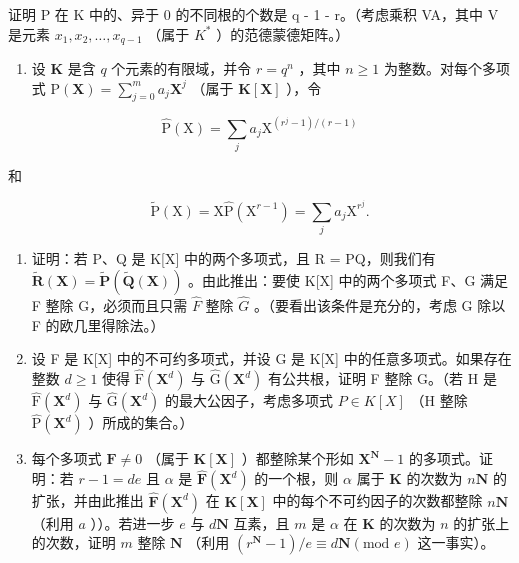 证明 P 在 K 中的、异于 0 的不同根的个数是 q - 1 - r。（考虑乘积 VA，其中 V 是元素 \(x_{1}, x_{2}, \ldots, x_{q-1}\) （属于 \(K^{*}\) ）的范德蒙德矩阵。）

\begin{enumerate}
\def\labelenumi{\arabic{enumi})}
\setcounter{enumi}{8}
\tightlist
\item
  设 \(\mathbf{K}\) 是含 \(q\) 个元素的有限域，并令 \(r = q^n\) ，其中 \(n \geqslant 1\) 为整数。对每个多项式 \(\mathrm{P}(\mathbf{X}) = \sum_{j=0}^{m} a_j \mathbf{X}^j\) （属于 \(\mathbf{K}[\mathbf{X}]\) ），令
\end{enumerate}

\[
\hat {\mathrm{P}} (\mathrm{X}) = \sum_ {j} a _ {j} \mathrm{X} ^ {(r ^ {j} - 1) / (r - 1)}
\]

和

\[
\tilde {\mathrm{P}} (\mathrm{X}) = \mathrm{X} \hat {\mathrm{P}} \left(\mathrm{X} ^ {r - 1}\right) = \sum_ {j} a _ {j} \mathrm{X} ^ {r ^ {j}}.
\]

\begin{enumerate}
\def\labelenumi{\alph{enumi})}
\item
  证明：若 P、Q 是 K{[}X{]} 中的两个多项式，且 R = PQ，则我们有 \(\tilde{\mathbf{R}}(\mathbf{X}) = \tilde{\mathbf{P}}(\tilde{\mathbf{Q}}(\mathbf{X}))\) 。由此推出：要使 K{[}X{]} 中的两个多项式 F、G 满足 F 整除 G，必须而且只需 \(\hat{F}\) 整除 \(\hat{G}\) 。（要看出该条件是充分的，考虑 G 除以 F 的欧几里得除法。）
\item
  设 F 是 K{[}X{]} 中的不可约多项式，并设 G 是 K{[}X{]} 中的任意多项式。如果存在整数 \(d \geqslant 1\) 使得 \(\hat{\mathrm{F}}(\mathbf{X}^{d})\) 与 \(\hat{\mathrm{G}}(\mathbf{X}^{d})\) 有公共根，证明 F 整除 G。（若 H 是 \(\hat{\mathrm{F}}(\mathbf{X}^{d})\) 与 \(\hat{\mathrm{G}}(\mathbf{X}^{d})\) 的最大公因子，考虑多项式 \(P \in K[X]\) （H 整除 \(\hat{\mathrm{P}}(\mathbf{X}^{d})\) ）所成的集合。）
\item
  每个多项式 \(\mathbf{F} \neq 0\) （属于 \(\mathbf{K}[\mathbf{X}]\) ）都整除某个形如 \(\mathbf{X}^{\mathbf{N}} - 1\) 的多项式。证明：若 \(r - 1 = de\) 且 \(\alpha\) 是 \(\hat{\mathbf{F}}(\mathbf{X}^{d})\) 的一个根，则 \(\alpha\) 属于 \(\mathbf{K}\) 的次数为 \(n\mathbf{N}\) 的扩张，并由此推出 \(\hat{\mathbf{F}}(\mathbf{X}^d)\) 在 \(\mathbf{K}[\mathbf{X}]\) 中的每个不可约因子的次数都整除 \(n\mathbf{N}\) （利用 \(a\) ））。若进一步 \(e\) 与 \(d\mathbf{N}\) 互素，且 \(m\) 是 \(\alpha\) 在 \(\mathbf{K}\) 的次数为 \(n\) 的扩张上的次数，证明 \(m\) 整除 \(\mathbf{N}\) （利用 \((r^{\mathbf{N}} - 1)/e \equiv d\mathbf{N} (\text{mod } e)\) 这一事实）。
\end{enumerate}

